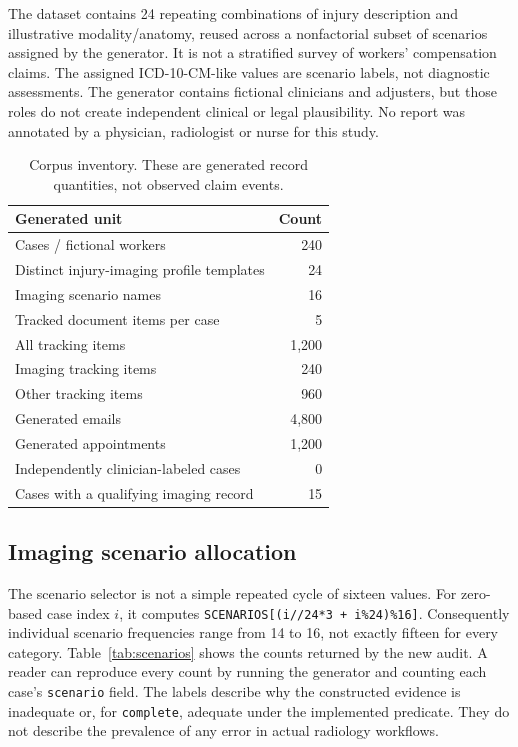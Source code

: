 \documentclass[11pt,twocolumn]{article}
\newcommand{\code}[1]{\texttt{#1}}
\begin{document}
The dataset contains 24 repeating combinations of injury description and illustrative modality/anatomy, reused across a nonfactorial subset of scenarios assigned by the generator. It is not a stratified survey of workers' compensation claims. The assigned ICD-10-CM-like values are scenario labels, not diagnostic assessments. The generator contains fictional clinicians and adjusters, but those roles do not create independent clinical or legal plausibility. No report was annotated by a physician, radiologist or nurse for this study.

\begin{table}[ht]\centering\small
\caption{Corpus inventory. These are generated record quantities, not observed claim events.}\label{tab:inventory}
\begin{tabular}{@{}p{}r@{}}\toprule
Generated unit & Count \\\midrule
Cases / fictional workers & 240 \\
Distinct injury-imaging profile templates & 24 \\
Imaging scenario names & 16 \\
Tracked document items per case & 5 \\
All tracking items & 1,200 \\
Imaging tracking items & 240 \\
Other tracking items & 960 \\
Generated emails & 4,800 \\
Generated appointments & 1,200 \\
Independently clinician-labeled cases & 0 \\
Cases with a qualifying imaging record & 15 \\\bottomrule
\end{tabular}
\end{table}

\subsection{Imaging scenario allocation}
The scenario selector is not a simple repeated cycle of sixteen values. For zero-based case index $i$, it computes \code{SCENARIOS[(i//24*3 + i\%24)\%16]}. Consequently individual scenario frequencies range from 14 to 16, not exactly fifteen for every category. Table~\ref{tab:scenarios} shows the counts returned by the new audit. A reader can reproduce every count by running the generator and counting each case's \code{scenario} field. The labels describe why the constructed evidence is inadequate or, for \code{complete}, adequate under the implemented predicate. They do not describe the prevalence of any error in actual radiology workflows.
\end{document}
